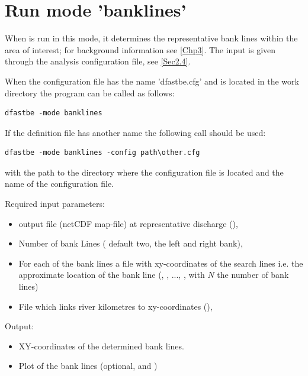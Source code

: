 \section{Run mode 'banklines'}

When \dfastbe is run in this mode, it determines the representative bank lines within the area of interest; for background information see \autoref{Chp3}.
The input is given through the analysis configuration file, see \autoref{Sec2.4}.

When the configuration file has the name 'dfastbe.cfg' and is located in the work directory the program can be called as follows:

\begin{Verbatim}
dfastbe -mode banklines
\end{Verbatim}

If the definition file has another name the following call should be used:

\begin{Verbatim}
dfastbe -mode banklines -config path\other.cfg
\end{Verbatim}

with  the path to the directory where the configuration file is located and  the name of the configuration file.

Required input parameters:

\begin{itemize}
\item \dflowfm output file (netCDF map-file) at representative discharge (),
\item Number of bank Lines ( default two, the left and right bank),
\item For each of the bank lines a file with xy-coordinates of the search lines i.e. the approximate location of the bank line (, , ..., , with $N$ the number of bank lines)
\item File which links river kilometres to xy-coordinates (),
\end{itemize}

Output:

\begin{itemize}
\item XY-coordinates of the determined bank lines.
\item Plot of the bank lines (optional,  and )
\end{itemize}

